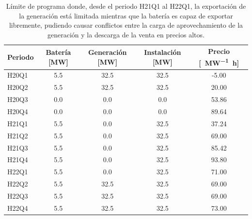 \begin{table}[ht]
  \centering
  \begin{tabular}{|l|S|S|S|S|}
    \hline
    Periodo & {Batería [\si{\mega\watt}]}  & {Generación [\si{\mega\watt}]}  & {Instalación [\si{\mega\watt}]}  & {Precio [\si{\text{\euro}\per\mega\watt\hour}]} \\
    \hline
    H20Q1   & 5.5                          & 32.5                            & 32.5                             & -5.00                                           \\
    H20Q2   & 5.5                          & 32.5                            & 32.5                             & 20.00                                           \\
    H20Q3   & 0.0                          &  0.0                            &  0.0                             & 53.86                                           \\
    H20Q4   & 0.0                          &  0.0                            &  0.0                             & 89.64                                           \\
    H21Q1   & 5.5                          &  0.0                            & 32.5                             & 37.24                                           \\
    H21Q2   & 5.5                          &  0.0                            & 32.5                             & 69.00                                           \\
    H21Q3   & 5.5                          &  0.0                            & 32.5                             & 85.42                                           \\
    H21Q4   & 5.5                          &  0.0                            & 32.5                             & 93.80                                           \\
    H22Q1   & 5.5                          &  0.0                            & 32.5                             & 71.00                                           \\
    H22Q2   & 5.5                          & 32.5                            & 32.5                             & 69.00                                           \\
    H22Q3   & 5.5                          & 32.5                            & 32.5                             & 69.00                                           \\
    H22Q4   & 5.5                          & 32.5                            & 32.5                             & 73.00                                           \\
    \hline
  \end{tabular}
  \caption[Límites de programa y conflictos en la exportación.]{Límite de programa donde, desde el periodo H21Q1 al H22Q1, la exportación de la generación está limitada mientras que la batería es capaz de exportar libremente, pudiendo causar conflictos entre la carga de aprovechamiento de la generación y la descarga de la venta en precios altos.}
  \label{tab:carga-descarga-simultanea}
\end{table}

